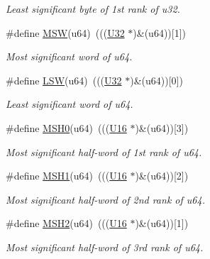 \begin{DoxyCompactItemize}
\begin{DoxyCompactList}\small\item\em Least significant byte of 1st rank of {\itshape u32}. \end{DoxyCompactList}\item 
\#define \mbox{\hyperlink{group__group__sam0__utils_gad71e5e84d2cec4387415a55f5c62b01b}{M\+SW}}(u64)~(((\mbox{\hyperlink{group__group__sam0__utils_ga696390429f2f3b644bde8d0322a24124}{U32}} $\ast$)\&(u64))\mbox{[}1\mbox{]})
\begin{DoxyCompactList}\small\item\em Most significant word of {\itshape u64}. \end{DoxyCompactList}\item 
\#define \mbox{\hyperlink{group__group__sam0__utils_ga0633993fb1f2d96a56385f09beed7bc7}{L\+SW}}(u64)~(((\mbox{\hyperlink{group__group__sam0__utils_ga696390429f2f3b644bde8d0322a24124}{U32}} $\ast$)\&(u64))\mbox{[}0\mbox{]})
\begin{DoxyCompactList}\small\item\em Least significant word of {\itshape u64}. \end{DoxyCompactList}\item 
\#define \mbox{\hyperlink{group__group__sam0__utils_ga280d6a94884872f6a5be80c873e8adc1}{M\+S\+H0}}(u64)~(((\mbox{\hyperlink{group__group__sam0__utils_ga0a0a322d5fa4a546d293a77ba8b4a71f}{U16}} $\ast$)\&(u64))\mbox{[}3\mbox{]})
\begin{DoxyCompactList}\small\item\em Most significant half-\/word of 1st rank of {\itshape u64}. \end{DoxyCompactList}\item 
\#define \mbox{\hyperlink{group__group__sam0__utils_ga43de4fac62f938ff4eb448a87522ec0e}{M\+S\+H1}}(u64)~(((\mbox{\hyperlink{group__group__sam0__utils_ga0a0a322d5fa4a546d293a77ba8b4a71f}{U16}} $\ast$)\&(u64))\mbox{[}2\mbox{]})
\begin{DoxyCompactList}\small\item\em Most significant half-\/word of 2nd rank of {\itshape u64}. \end{DoxyCompactList}\item 
\#define \mbox{\hyperlink{group__group__sam0__utils_ga5d32ec744212194c8106c51b89a5dfe9}{M\+S\+H2}}(u64)~(((\mbox{\hyperlink{group__group__sam0__utils_ga0a0a322d5fa4a546d293a77ba8b4a71f}{U16}} $\ast$)\&(u64))\mbox{[}1\mbox{]})
\begin{DoxyCompactList}\small\item\em Most significant half-\/word of 3rd rank of {\itshape u64}. \end{DoxyCompactList}\item 

\end{DoxyCompactItemize}
